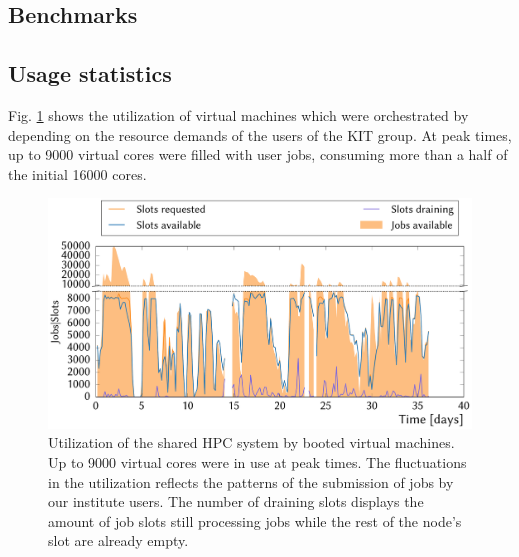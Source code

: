 \subsection{Benchmarks}




%
%
%
\subsection{Usage statistics}
Fig. \ref{fig-frplots} shows the utilization of virtual machines which were orchestrated by \Roced depending on the resource demands of the users of the KIT group.
At peak times, up to 9000 virtual cores were filled with user jobs, consuming more than a half of the initial 16000 \NEMO cores.

\begin{figure}
\begin{center}
  \includegraphics[width=1.0\linewidth]{figures/NEMO_KIT_utiliztion.pdf}
  \caption{Utilization of the shared HPC system by booted virtual machines. Up to 9000 virtual cores were in use at peak times. The fluctuations in the utilization reflects the patterns of the submission of jobs by our institute users. The number of draining slots displays the amount of job slots still processing jobs while the rest of the node's slot are already empty.}
  \label{fig-frplots}
\end{center}
\end{figure}

